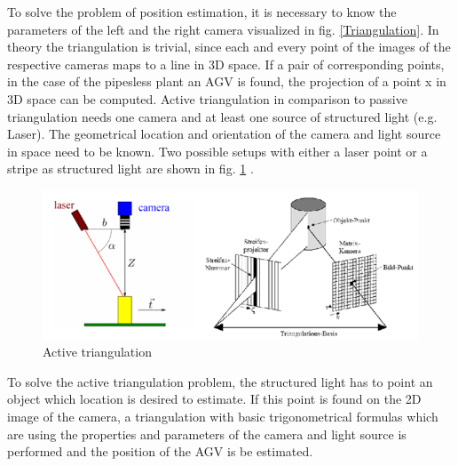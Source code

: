 \pagebreak
To solve the problem of position estimation, it is necessary to know the parameters of the left and the right camera visualized in fig. \ref{Triangulation}. In theory the triangulation is trivial, since each and every point of the images of the respective cameras maps to a line in 3D space. If a pair of corresponding points, in the case of the pipesless plant an AGV is found, the projection of a point x in 3D space can be computed. 
Active triangulation in comparison to passive triangulation needs one camera and at least one source of structured light (e.g. Laser). The geometrical location and orientation of the camera and light source in space need to be known. Two possible setups with either a laser point or a stripe as structured light are shown in fig. \ref{ative_Triangulation} \cite{MultiObjectTriangulation.}\cite{laser_triangulation}.\\
\begin{figure}[!htbp]
\centering
\includegraphics[width = 16cm]{Pictures/acticetriangulation}
\caption{Active triangulation}
\label{ative_Triangulation}
\end{figure}
\pagebreak
To solve the active triangulation problem, the structured light has to point an object which location is desired to estimate. If this point is found on the 2D image of the camera, a triangulation with basic trigonometrical formulas which are using the properties and parameters of the camera and light source is performed and the position of the AGV is be estimated.\\
\pagebreak

